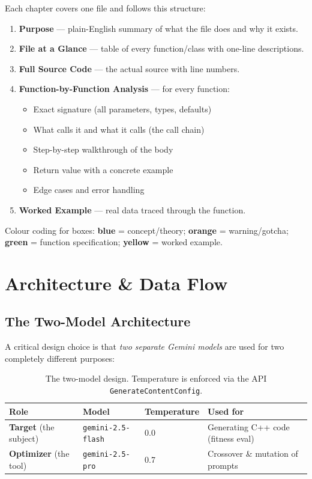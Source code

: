 \documentclass[11pt,a4paper]{report}
\begin{document}
Each chapter covers one file and follows this structure:
\begin{enumerate}[nosep]
  \item \textbf{Purpose} --- plain-English summary of what the file does and why it exists.
  \item \textbf{File at a Glance} --- table of every function/class with one-line descriptions.
  \item \textbf{Full Source Code} --- the actual source with line numbers.
  \item \textbf{Function-by-Function Analysis} --- for every function:
    \begin{itemize}[nosep]
      \item Exact signature (all parameters, types, defaults)
      \item What calls it and what it calls (the call chain)
      \item Step-by-step walkthrough of the body
      \item Return value with a concrete example
      \item Edge cases and error handling
    \end{itemize}
  \item \textbf{Worked Example} --- real data traced through the function.
\end{enumerate}

Colour coding for boxes: \textbf{blue} = concept/theory; \textbf{orange} = warning/gotcha;
\textbf{green} = function specification; \textbf{yellow} = worked example.


\chapter{Architecture \& Data Flow}

\section{The Two-Model Architecture}

A critical design choice is that \emph{two separate Gemini models} are used for two
completely different purposes:

\begin{table}[h]
\centering
\begin{tabular}{@{}lllp{5cm}@{}}
\toprule
\textbf{Role} & \textbf{Model} & \textbf{Temperature} & \textbf{Used for} \\
\midrule
\textbf{Target} (the subject)   & \texttt{gemini-2.5-flash} & 0.0 & Generating C++ code (fitness eval) \\
\textbf{Optimizer} (the tool)   & \texttt{gemini-2.5-pro}   & 0.7 & Crossover \& mutation of prompts \\
\bottomrule
\end{tabular}
\caption{The two-model design. Temperature is enforced via the API \texttt{GenerateContentConfig}.}
\end{table}
\end{document}
